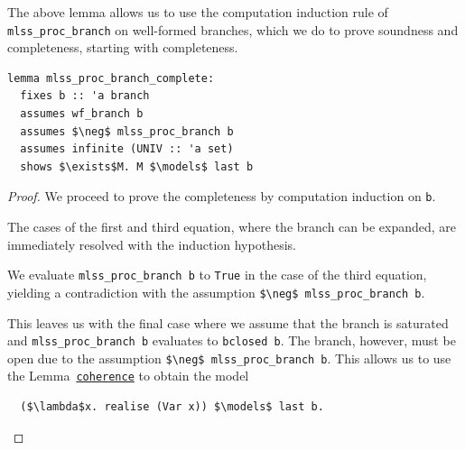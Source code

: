 \documentclass[
  sigplan,
  10pt,
  ]{acmart}
\begin{document}
\noindent The above lemma allows us to use the computation induction rule of \lstinline!mlss_proc_branch! on well-formed branches, which we do to prove soundness and completeness, starting with completeness.
\begin{lstlisting}[belowskip=0pt]
lemma mlss_proc_branch_complete:
  fixes b :: 'a branch
  assumes wf_branch b
  assumes $\neg$ mlss_proc_branch b
  assumes infinite (UNIV :: 'a set)
  shows $\exists$M. M $\models$ last b
\end{lstlisting}
\begin{proof}
  We proceed to prove the completeness by computation induction on \lstinline!b!.

  The cases of the first and third equation, where the branch can be expanded, are immediately resolved with the induction hypothesis.

  We evaluate \lstinline!mlss_proc_branch b! to \lstinline!True! in the case of the third equation, yielding a contradiction with the assumption \lstinline!$\neg$ mlss_proc_branch b!.

  This leaves us with the final case where we assume that the branch is saturated and \lstinline!mlss_proc_branch b! evaluates to \lstinline!bclosed b!.
  The branch, however, must be open due to the assumption \lstinline!$\neg$ mlss_proc_branch b!.
  This allows us to use the Lemma~\hyperref[lst:coherence]{\lstinline!coherence!} to obtain the model
\begin{lstlisting}
  ($\lambda$x. realise (Var x)) $\models$ last b.
\end{lstlisting}
\end{proof}
\end{document}
